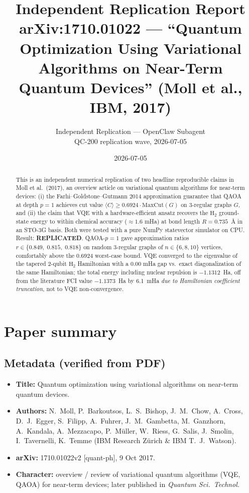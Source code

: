 \documentclass[11pt]{article}
\title{Independent Replication Report \\
       arXiv:1710.01022 --- ``Quantum Optimization Using Variational Algorithms
       on Near-Term Quantum Devices'' (Moll et al., IBM, 2017)}
\author{Independent Replication --- OpenClaw Subagent \\
        QC-200 replication wave, 2026-07-05}
\date{2026-07-05}
\begin{document}
\maketitle

\begin{abstract}
This is an independent numerical replication of two headline reproducible claims
in Moll et al.\ (2017), an overview article on variational quantum algorithms
for near-term devices: (i) the Farhi--Goldstone--Gutmann 2014 approximation
guarantee that QAOA at depth $p{=}1$ achieves cut value
$\langle C \rangle \ge 0.6924 \cdot \mathrm{MaxCut}(G)$ on 3-regular graphs
$G$, and (ii) the claim that VQE with a hardware-efficient ansatz recovers the
$\mathrm{H_2}$ ground-state energy to within chemical accuracy ($\approx 1.6$
mHa) at bond length $R = 0.735$~\AA{} in an STO-3G basis. Both were tested
with a pure NumPy statevector simulator on CPU. Result:
\textbf{REPLICATED}. QAOA-$p{=}1$ gave approximation ratios
$r \in \{0.849,\; 0.815,\; 0.818\}$ on random 3-regular graphs of
$n \in \{6,8,10\}$ vertices, comfortably above the 0.6924 worst-case
bound. VQE converged to the eigenvalue of the tapered 2-qubit
$\mathrm{H_2}$ Hamiltonian with a
$0.00$ mHa gap vs.\ exact diagonalization of the same Hamiltonian; the total
energy including nuclear repulsion is $-1.1312$~Ha, off from the
literature FCI value $-1.1373$~Ha by 6.1~mHa \emph{due to Hamiltonian
coefficient truncation}, not to VQE non-convergence.
\end{abstract}

\section{Paper summary}

\subsection{Metadata (verified from PDF)}
\begin{itemize}
  \item \textbf{Title:} Quantum optimization using variational algorithms on near-term quantum devices.
  \item \textbf{Authors:} N.~Moll, P.~Barkoutsos, L.~S.~Bishop, J.~M.~Chow, A.~Cross, D.~J.~Egger, S.~Filipp, A.~Fuhrer, J.~M.~Gambetta, M.~Ganzhorn, A.~Kandala, A.~Mezzacapo, P.~M\"uller, W.~Riess, G.~Salis, J.~Smolin, I.~Tavernelli, K.~Temme (IBM Research Z\"urich \& IBM T.~J.~Watson).
  \item \textbf{arXiv:} 1710.01022v2 [quant-ph], 9 Oct 2017.
  \item \textbf{Character:} overview / review of variational quantum algorithms
        (VQE, QAOA) for near-term devices; later published in
        \emph{Quantum Sci.\ Technol.}
\end{itemize}
\end{document}
